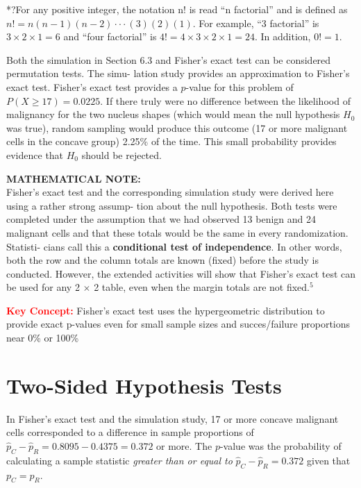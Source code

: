 \documentclass[
]{report}
\begin{document}
*?For any positive integer, the notation n! is read ``n factorial'' and is defined as \(n!= n(n- 1)(n- 2) \cdot\cdot\cdot (3)(2)(1)\).
For example, ``3 factorial'' is \(3 \times 2 \times 1= 6\) and ``four factorial'' is \(4!= 4 \times 3 \times 2 \times 1= 24\). In addition, \(0!= 1\).

Both the simulation in Section 6.3 and Fisher's exact test can be considered permutation tests. The simu-
lation study provides an approximation to Fisher's exact test. Fisher's exact test provides a \(p\)-value for this
problem of \(P(X \geq 17)= 0.0225\). If there truly were no difference between the likelihood of malignancy for
the two nucleus shapes (which would mean the null hypothesis \(H_0\) was true), random sampling would produce
this outcome (17 or more malignant cells in the concave group) 2.25\% of the time. This small probability
provides evidence that \(H_0\) should be rejected.

\large

\textbf{MATHEMATICAL NOTE:}\\
Fisher's exact test and the corresponding simulation study were derived here using a rather strong assump-
tion about the null hypothesis. Both tests were completed under the assumption that we had observed 13
benign and 24 malignant cells and that these totals would be the same in every randomization. Statisti-
cians call this a \textbf{conditional test of independence}. In other words, both the row and the column totals
are known (fixed) before the study is conducted. However, the extended activities will show that Fisher's
exact test can be used for any 2 \(\times\) 2 table, even when the margin totals are not fixed.\(^5\)
\normalsize 

\Large

\textbf{\textcolor{red}{Key Concept:}}
\color{red}Fisher's exact test uses the hypergeometric distribution to provide exact p-values even for small sample sizes and succes/failure proportions near 0\% or 100\%
\color{black}
\normalsize

\section{\texorpdfstring{\textbf{Two-Sided Hypothesis Tests}}{Two-Sided Hypothesis Tests}}\label{two-sided-hypothesis-tests}

In Fisher's exact test and the simulation study, 17 or more concave malignant cells corresponded to a difference in sample proportions of \(\hat p_C - \hat p_R = 0.8095 - 0.4375 = 0.372\) or more. The \(p\)-value was the probability of calculating a sample statistic \emph{greater than or equal to} \(\hat p_C - \hat p_R = 0.372\) given that \(p_C = p_R\).
\end{document}
